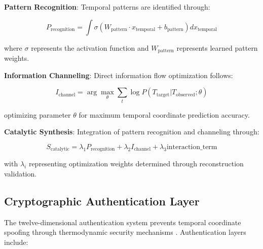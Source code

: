 \documentclass[11pt]{article}
\theoremstyle{remark}
\begin{document}
\textbf{Pattern Recognition}: Temporal patterns are identified through:

$$P_{\text{recognition}} = \int \sigma(W_{\text{pattern}} \cdot x_{\text{temporal}} + b_{\text{pattern}}) dx_{\text{temporal}}$$

where $\sigma$ represents the activation function and $W_{\text{pattern}}$ represents learned pattern weights.

\textbf{Information Channeling}: Direct information flow optimization follows:

$$I_{\text{channel}} = \arg\max_\theta \sum_t \log P(T_{\text{target}}|T_{\text{observed}}; \theta)$$

optimizing parameter $\theta$ for maximum temporal coordinate prediction accuracy.

\textbf{Catalytic Synthesis}: Integration of pattern recognition and channeling through:

$$S_{\text{catalytic}} = \lambda_1 P_{\text{recognition}} + \lambda_2 I_{\text{channel}} + \lambda_3 \text{interaction\_term}$$

with $\lambda_i$ representing optimization weights determined through reconstruction validation.

\subsection{Cryptographic Authentication Layer}

The twelve-dimensional authentication system prevents temporal coordinate spoofing through thermodynamic security mechanisms \cite{sachikonye2024cryptographic}. Authentication layers include:
\end{document}
